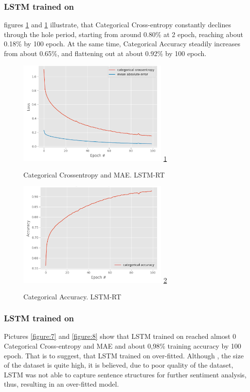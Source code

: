 \documentclass[conference]{IEEEtran}
\begin{document}
		\subsubsection{LSTM trained on \RT}
			
			figures \ref{figure:5} and \ref{figure:5} illustrate, that Categorical Cross-entropy constantly declines through the hole period, starting from around 0.80\% at 2 epoch, reaching about 0.18\% by 100 epoch. At the same time, Categorical Accuracy steadily increases from about 0.65\%, and flattening out at about 0.92\% by 100 epoch.
			
			\begin{figure}
				\caption{Categorical Crossentropy and MAE. LSTM-RT}
				\centering
				\includegraphics[width=7.5cm]{categorical_crossentropy_mae_lstm-rt.png}
				\label{figure:5}
				\ref{figure:5}
			\end{figure}
			
			\begin{figure}
				\caption{Categorical Accuracy. LSTM-RT}
				\centering
				\includegraphics[width=7.5cm]{categorical_accuracy_lstm-rt.png}
				\label{figure:6}
				\ref{figure:6}
			\end{figure}
		
		\subsubsection{LSTM trained on \TW}
		
			Pictures \ref{figure:7} and \ref{figure:8} show that LSTM trained on \RT reached almost 0 Categorical Cross-entropy and MAE and about 0,98\% training accuracy by 100 epoch. That is to suggest, that LSTM trained on \TW over-fitted. Although , the size of the \TW dataset is quite high, it is believed, due to poor quality of the dataset, LSTM was not able to capture sentence structures for further sentiment analysis, thus, resulting in an over-fitted model.
			
\end{document}
